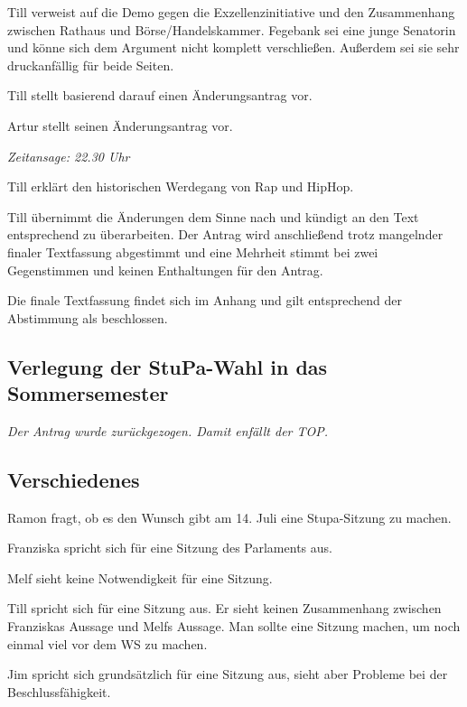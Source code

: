 \documentclass[ngerman,headheight=70pt]{scrartcl}
\begin{document}
    Till verweist auf die Demo gegen die Exzellenzinitiative und den Zusammenhang
    zwischen Rathaus und Börse/Handelskammer. Fegebank sei eine junge Senatorin
    und könne sich dem Argument nicht komplett verschließen. Außerdem sei sie
    sehr druckanfällig für beide Seiten.

    Till stellt basierend darauf einen Änderungsantrag vor.


    Artur stellt seinen Änderungsantrag vor.


    \textit{Zeitansage: 22.30 Uhr}

    Till erklärt den historischen Werdegang von Rap und HipHop.

    Till übernimmt die Änderungen dem Sinne nach und kündigt an den Text entsprechend
    zu überarbeiten. Der Antrag wird anschließend trotz mangelnder finaler Textfassung
    abgestimmt und eine Mehrheit stimmt bei zwei Gegenstimmen und keinen Enthaltungen
    für den Antrag.

    Die finale Textfassung findet sich im Anhang und gilt entsprechend der Abstimmung
    als beschlossen.

    \subsection{Verlegung der StuPa-Wahl in das Sommersemester}

    \textit{Der Antrag wurde zurückgezogen. Damit enfällt der TOP.}

    \subsection{Verschiedenes}

    Ramon fragt, ob es den Wunsch gibt am 14. Juli eine Stupa-Sitzung zu machen.

    Franziska spricht sich für eine Sitzung des Parlaments aus.

    Melf sieht keine Notwendigkeit für eine Sitzung.

    Till spricht sich für eine Sitzung aus. Er sieht keinen Zusammenhang
    zwischen Franziskas Aussage und Melfs Aussage. Man sollte eine Sitzung machen,
    um noch einmal viel vor dem WS zu machen.

    Jim spricht sich grundsätzlich für eine Sitzung aus, sieht aber Probleme
    bei der Beschlussfähigkeit.
\end{document}
